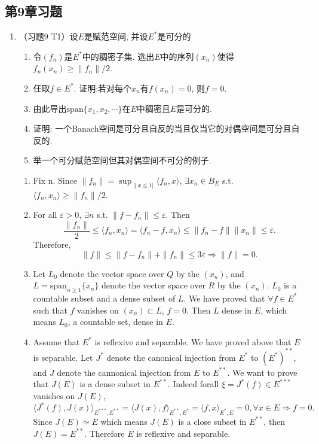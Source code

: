 \subsection{第9章习题}
\begin{enumerate}
  \item （习题9 T1）设$E$是赋范空间, 并设$E^*$是可分的
    \begin{enumerate}
        \item 令$(f_n)$是$E^*$中的稠密子集. 选出$E$中的序列$(x_n)$使得$f_n(x_n)\geq \|f_n\|/2$.
        \item 任取$f\in E^*$. 证明:若对每个$x_n$有$f(x_n)=0$, 则$f=0$.
        \item 由此导出$\text{span}\{x_1, x_2, \cdots\}$在$E$中稠密且$E$是可分的.
        \item 证明: 一个Banach空间是可分且自反的当且仅当它的对偶空间是可分且自反的.
        \item 举一个可分赋范空间但其对偶空间不可分的例子.
    \end{enumerate}
    \begin{answer}
      \begin{enumerate}
        \item Fix n. Since $\|f_n\| = \sup_{\|x\leq 1|}\langle f_n, x \rangle$,  $\exists x_n\in B_E$ s.t.  $\langle f_n, x_n\rangle \geq \|f_n\|/2$.
        \item For all $\varepsilon > 0$, $\exists n$ s.t. $\|f - f_n\|\leq \varepsilon$. Then
        \[
            \frac{\|f_n\|}{2}\leq\langle f_n, x_n\rangle = \langle f_n - f, x_n\rangle \leq \|f_n - f\|\|x_n\|\leq \varepsilon.
        \]
        Therefore,
        \[
            \|f\|\leq \|f - f_n\| + \|f_n\|\leq 3\varepsilon \Rightarrow \|f\| = 0.
        \]
        \item Let $L_0$ denote the vector space over $Q$ by the $(x_n)$, and $L=\text{span}_{n\geq1}\{x_n\}$ denote the vector space over $R$ by the $(x_n)$. $L_0$ is a countable subset and a dense subset of $L$.  We have proved that $\forall f \in E^*$ such that $f$ vanishes on $(x_n)\subset L$, $f = 0$. Then $L$ dense in $E$, which means $L_0$, a countable set, dense in $E$.
        \item Assume that $E^*$ is reflexive and separable. We have proved above that $E$ is separable. Let $J^*$ denote the canonical injection from $E^*$ to $(E^*)^{**}$, and $J$ denote the cannonical injection from $E$ to $E^{**}$. We want to prove that $J(E)$ is a dense subset in $E^{**}$. Indeed forall $\xi = J^*(f)\in E^{***}$ vanishes on $J(E)$,
        \[
            \langle J^*(f), J(x)\rangle_{E^{***},E^{**}} =
            \langle J(x), f\rangle_{E^{**}, E^*} =
            \langle f, x\rangle_{E^*, E} = 0, \forall x \in E
            \Rightarrow f = 0.
        \]
        Since $J(E)\simeq E$ which means $J(E)$ is a close subset in $E^{**}$, then $J(E) = E^{**}$. Therefore $E$ is reflexive and separable.


\end{enumerate}
\end{answer}
\end{enumerate}
